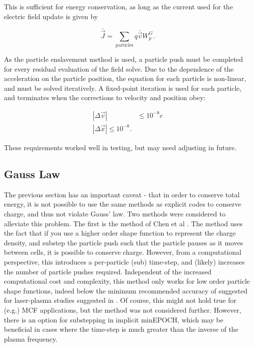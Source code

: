 \documentclass{article}
\begin{document}
This is sufficient for energy conservation, as long as the current used for the electric field update is given by

\begin{equation}
  \bar{\vec{J}} = \sum_{\mathrm{particles}} q \bar{\vec{v}} W_p^G.
\end{equation}

As the particle enslavement method is used, a particle push must be completed for every residual evaluation of the field solve. Due to the dependence of the acceleration on the particle position, the equation for each particle is non-linear, and must be solved iteratively. A fixed-point iteration is used for each particle, and terminates when the corrections to velocity and position obey:

\begin{align}
  \left| \Delta \vec{v}\right| &\leq 10^{-8} c \\
  \left| \Delta \vec{x}\right| \leq 10^{-8}.
\end{align}

These requirements worked well in testing, but may need adjusting in future.


\subsection{Gauss Law}

The previous section has an important caveat - that in order to conserve total energy, it is not possible to use the same methods as explicit codes to conserve charge, and thus not violate Gauss' law.
Two methods were considered to alleviate this problem. The first is the method of Chen et al \cite{chen}. The method uses the fact that if you use a higher order shape function to represent the charge density, and substep the particle push such that the particle pauses as it moves between cells, it is possible to conserve charge. However, from a computational perspective, this introduces a per-particle (sub) time-step, and (likely) increases the number of particle pushes required. Independent of the increased computational cost and complexity, this method only works for low order particle shape functions, indeed below the minimum recommended accuracy of suggested for laser-plasma studies suggested in \cite{EPOCH}. Of course, this might not hold true for (e.g.) MCF applications, but the method was not considered further. However, there is an option for substepping in implicit minEPOCH, which may be beneficial in cases where the time-step is much greater than the inverse of the plasma frequency.
\end{document}
